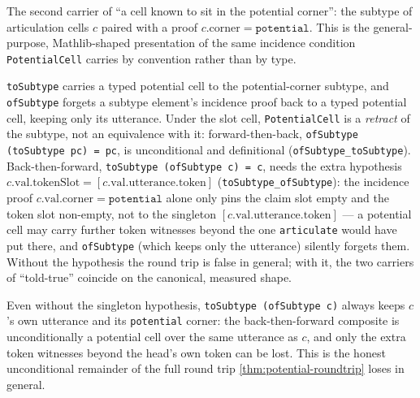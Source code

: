 \begin{proposition}\label{thm:potential-subtype}\leanok{}
The second carrier of ``a cell known to sit in the potential corner'': the
subtype of articulation cells \(c\) paired with a proof
\(c.\mathrm{corner} = \mathtt{potential}\). This is the general-purpose,
Mathlib-shaped presentation of the same incidence condition
\texttt{PotentialCell} carries by convention rather than by type.
\end{proposition}

\begin{theorem}\label{thm:potential-roundtrip}\leanok{}
\texttt{toSubtype} carries a typed potential cell to the potential-corner
subtype, and \texttt{ofSubtype} forgets a subtype element's incidence proof
back to a typed potential cell, keeping only its utterance. Under the slot
cell, \texttt{PotentialCell} is a \emph{retract} of the subtype, not an
equivalence with it: forward-then-back,
\texttt{ofSubtype\,(toSubtype\,pc) = pc}, is unconditional and definitional
(\texttt{ofSubtype\_toSubtype}). Back-then-forward,
\texttt{toSubtype\,(ofSubtype\,c) = c}, needs the extra hypothesis
\(c.\mathrm{val}.\mathrm{tokenSlot} = [c.\mathrm{val}.\mathrm{utterance}.\mathrm{token}]\)
(\texttt{toSubtype\_ofSubtype}): the incidence proof
\(c.\mathrm{val}.\mathrm{corner} = \mathtt{potential}\) alone only pins the
claim slot empty and the token slot non-empty, not to the singleton
\([c.\mathrm{val}.\mathrm{utterance}.\mathrm{token}]\) --- a potential cell may
carry further token witnesses beyond the one \texttt{articulate} would have
put there, and \texttt{ofSubtype} (which keeps only the utterance) silently
forgets them. Without the hypothesis the round trip is false in general; with
it, the two carriers of ``told-true'' coincide on the canonical, measured
shape.
\end{theorem}

\begin{proposition}\label{thm:potential-roundtrip-survives}\leanok{}
Even without the singleton hypothesis, \texttt{toSubtype\,(ofSubtype\,c)}
always keeps \(c\)'s own utterance and its \texttt{potential} corner: the
back-then-forward composite is unconditionally a potential cell over the same
utterance as \(c\), and only the extra token witnesses beyond the head's own
token can be lost. This is the honest unconditional remainder of the full
round trip \cref{thm:potential-roundtrip} loses in general.
\end{proposition}

